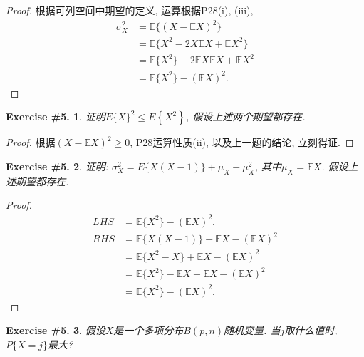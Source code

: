 \documentclass[UTF8, a4paper]{article}
\newtheorem{exercise}{Exercise \#5.}
\begin{document}
\begin{proof}
根据可列空间中期望的定义, 运算根据P28(i), (iii), 
$$
\begin{aligned}
    \sigma_X^2 &= \mathbb{E}\{(X - \mathbb{E}X)^2\} \\
    &= \mathbb{E}\{X^2 - 2X\mathbb{E}X + \mathbb{E}X^2\} \\
    &= \mathbb{E}\{X^2\} - 2\mathbb{E}X\mathbb{E}X + \mathbb{E}X^2 \\
    &= \mathbb{E}\{X^2\} - (\mathbb{E}X)^2.
\end{aligned}
$$
\end{proof}


\begin{framed}
\begin{exercise}
证明$E\{X\}^2 \leq E\left\{X^2\right\}$, 假设上述两个期望都存在.
\end{exercise}
\end{framed}

\begin{proof}
根据\((X-\mathbb{E}X)^2 \geq 0\), P28运算性质(ii), 以及上一题的结论, 立刻得证.
\end{proof}

\begin{framed}
\begin{exercise}
证明: $\sigma_X^2=E\{X(X-1)\}+\mu_X-\mu_X^2$, 其中\(\mu_X = \mathbb{E}X\). 假设上述期望都存在.
\end{exercise}
\end{framed}

\begin{proof}
$$
\begin{aligned}
    LHS &=  \mathbb{E}\{X^2\} - (\mathbb{E}X)^2.\\
    RHS &= \mathbb{E}\{X(X-1)\} + \mathbb{E}X - (\mathbb{E}X)^2 \\
    &= \mathbb{E}\{X^2 - X\} + \mathbb{E}X - (\mathbb{E}X)^2 \\
    &= \mathbb{E}\{X^2\} - \mathbb{E}X + \mathbb{E}X - (\mathbb{E}X)^2 \\
    &= \mathbb{E}\{X^2\} - (\mathbb{E}X)^2.
\end{aligned}
$$
\end{proof}


\begin{framed}
\begin{exercise}
假设\(X\)是一个多项分布\(B(p,n)\)随机变量.
当\(j\)取什么值时, \(P\{X = j\}\)最大?
\end{exercise}
\end{framed}
\end{document}
